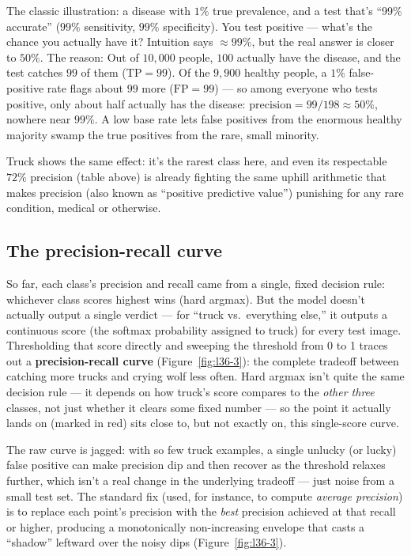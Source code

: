 The classic illustration: a disease with $1\%$ true prevalence, and a test that's ``99\% accurate'' ($99\%$ sensitivity, $99\%$ specificity). You test positive --- what's the chance you actually have it? Intuition says $\approx\!99\%$, but the real answer is closer to $50\%$. The reason: Out of $10{,}000$ people, $100$ actually have the disease, and the test catches $99$ of them ($\text{TP}=99$). Of the $9{,}900$ healthy people, a $1\%$ false-positive rate flags about $99$ more ($\text{FP}=99$) --- so among everyone who tests positive, only about half actually has the disease: $\text{precision}=99/198\approx50\%$, nowhere near $99\%$. A low base rate lets false positives from the enormous healthy majority swamp the true positives from the rare, small minority.

Truck shows the same effect: it's the rarest class here, and even its respectable $72\%$ precision (table above) is already fighting the same uphill arithmetic that makes precision (also known as ``positive predictive value'') punishing for any rare condition, medical or otherwise.

\subsection*{The precision-recall curve}

So far, each class's precision and recall came from a single, fixed decision rule: whichever class scores highest wins (hard argmax). But the model doesn't actually output a single verdict --- for ``truck vs.\ everything else,'' it outputs a continuous score (the softmax probability assigned to truck) for every test image. Thresholding that score directly and sweeping the threshold from 0 to 1 traces out a \textbf{precision-recall curve} (Figure~\ref{fig:l36-3}): the complete tradeoff between catching more trucks and crying wolf less often. Hard argmax isn't quite the same decision rule --- it depends on how truck's score compares to the \emph{other three} classes, not just whether it clears some fixed number --- so the point it actually lands on (marked in red) sits close to, but not exactly on, this single-score curve.

The raw curve is jagged: with so few truck examples, a single unlucky (or lucky) false positive can make precision dip and then recover as the threshold relaxes further, which isn't a real change in the underlying tradeoff --- just noise from a small test set. The standard fix (used, for instance, to compute \emph{average precision}) is to replace each point's precision with the \emph{best} precision achieved at that recall or higher, producing a monotonically non-increasing envelope that casts a ``shadow'' leftward over the noisy dips (Figure~\ref{fig:l36-3}).

